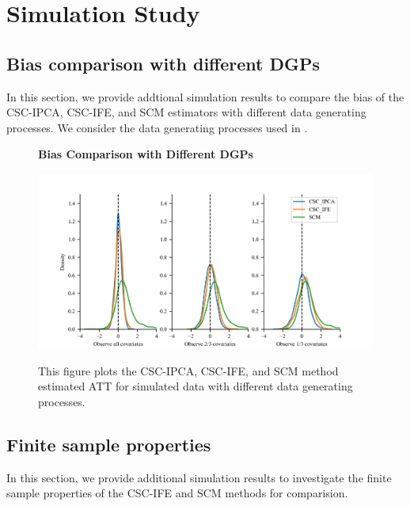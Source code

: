 \documentclass[12pt]{article}
\begin{document}
\section{Simulation Study}
\subsection{Bias comparison with different DGPs}
In this section, we provide addtional simulation results to compare the bias of the CSC-IPCA, CSC-IFE, and SCM estimators with different data generating processes. We consider the data generating processes used in \cite{xu2017generalized}.

\begin{figure}[!ht]
    \centering
    \caption{\textbf{Bias Comparison with Different DGPs}}
    \includegraphics{figs/bias_compar2.png}
    \label{app: bias 2}
    \caption*{\footnotesize{This figure plots the CSC-IPCA, CSC-IFE, and SCM method estimated ATT for simulated data with different data generating processes.}}
    \end{figure}

\subsection{Finite sample properties}
\label{app: finite sample}
In this section, we provide additional simulation results to investigate the finite sample properties of the CSC-IFE and SCM methods for comparision.
\end{document}
